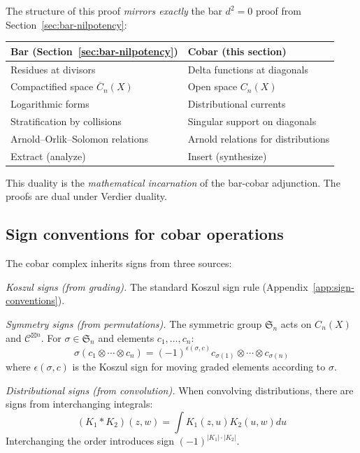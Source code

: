 \begin{remark}[Duality with bar \texorpdfstring{$d^2=0$}{d\textasciicircum 2=0} proof]\label{rem:bar-cobar-d2-duality}
The structure of this proof \emph{mirrors exactly} the bar $d^2=0$ proof from 
Section~\ref{sec:bar-nilpotency}:

\begin{center}
\begin{tabular}{l|l}
\textbf{Bar (Section~\ref{sec:bar-nilpotency})} & \textbf{Cobar (this section)} \\ \hline
Residues at divisors & Delta functions at diagonals \\
Compactified space $\overline{C}_n(X)$ & Open space $C_n(X)$ \\
Logarithmic forms & Distributional currents \\
Stratification by collisions & Singular support on diagonals \\
Arnold--Orlik--Solomon relations & Arnold relations for distributions \\
Extract (analyze) & Insert (synthesize) \\
\end{tabular}
\end{center}

This duality is the \emph{mathematical incarnation} of the bar-cobar adjunction. 
The proofs are dual under Verdier duality.
\end{remark}

\subsection{Sign conventions for cobar operations}


\begin{convention}\label{conv:cobar-signs}
The cobar complex inherits signs from three sources:

\emph{Koszul signs (from grading).}
The standard Koszul sign rule (Appendix~\ref{app:sign-conventions}).

\emph{Symmetry signs (from permutations).}
The symmetric group $\mathfrak{S}_n$ acts on $C_n(X)$ and $\mathcal{C}^{\boxtimes n}$. 
For $\sigma \in \mathfrak{S}_n$ and elements $c_1, \ldots, c_n$:
\[\sigma(c_1 \otimes \cdots \otimes c_n) = (-1)^{\epsilon(\sigma, c)} 
c_{\sigma(1)} \otimes \cdots \otimes c_{\sigma(n)}\]
where $\epsilon(\sigma, c)$ is the Koszul sign for moving graded elements according 
to $\sigma$.

\emph{Distributional signs (from convolution).}
When convolving distributions, there are signs from interchanging integrals:
\[(K_1 * K_2)(z, w) = \int K_1(z, u) K_2(u, w) du\]
Interchanging the order introduces sign $(-1)^{|K_1| \cdot |K_2|}$.
\end{convention}

